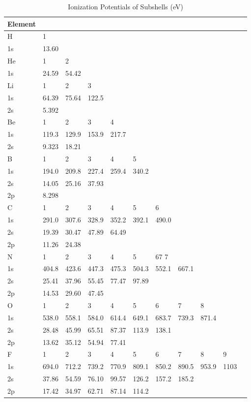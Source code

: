 \begin{table}
\label{tab:SubshellIonizationPotentials}
\caption{Ionization Potentials of Subshells (eV)}
\begin{tabular}{lllllllllll}
\hline
Element\\
\hline
H&    1\\
\hline
1s& 13.60\\
\hline
He&   1&   2\\
\hline
1s& 24.59& 54.42\\
\hline
Li&   1&   2&   3\\
\hline
1s& 64.39& 75.64& 122.5\\
2s& 5.392\\
\hline
Be&   1&   2&   3&   4\\
\hline
1s& 119.3& 129.9& 153.9& 217.7\\
2s& 9.323& 18.21\\
\hline
B& 1&   2&   3&   4&   5\\
\hline
1s& 194.0& 209.8& 227.4& 259.4& 340.2\\
2s& 14.05& 25.16& 37.93\\
2p& 8.298\\
\hline
C&    1&   2&   3&   4&   5&   6\\
\hline
1s& 291.0& 307.6& 328.9& 352.2& 392.1& 490.0\\
2s& 19.39& 30.47& 47.89& 64.49\\
2p& 11.26& 24.38\\
\hline
N&    1&   2&   3&   4&   5&   67   7\\
\hline
1s& 404.8&
423.6& 447.3& 475.3& 504.3& 552.1& 667.1\\
2s& 25.41& 37.96& 55.45& 77.47& 97.89\\
2p& 14.53&
29.60& 47.45\\
\hline
O& 1& 2& 3& 4& 5& 6& 7& 8\\
\hline
1s& 538.0& 558.1& 584.0& 614.4&
649.1& 683.7& 739.3& 871.4\\
2s& 28.48& 45.99& 65.51& 87.37& 113.9& 138.1\\
2p& 13.62& 35.12&
54.94& 77.41\\
\hline
F&    1&   2&   3&   4&   5&   6&   7&   8&   9\\
\hline
1s& 694.0& 712.2& 739.2& 770.9&
809.1& 850.2& 890.5& 953.9&  1103\\
2s& 37.86& 54.59& 76.10& 99.57& 126.2& 157.2& 185.2\\
2p& 17.42& 34.97& 62.71& 87.14& 114.2\\
\hline
\end{tabular}
\end{table}

